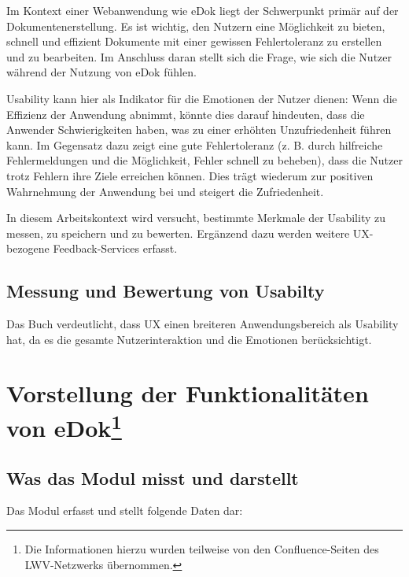 \documentclass[12pt,oneside]{article}
\begin{document}
Im Kontext einer Webanwendung wie eDok liegt der Schwerpunkt primär auf der Dokumentenerstellung. Es ist wichtig, den Nutzern eine Möglichkeit zu bieten, schnell und effizient Dokumente mit einer gewissen Fehlertoleranz zu erstellen und zu bearbeiten. Im Anschluss daran stellt sich die Frage, wie sich die Nutzer während der Nutzung von eDok fühlen.

Usability kann hier als Indikator für die Emotionen der Nutzer dienen: Wenn die Effizienz der Anwendung abnimmt, könnte dies darauf hindeuten, dass die Anwender Schwierigkeiten haben, was zu einer erhöhten Unzufriedenheit führen kann. Im Gegensatz dazu zeigt eine gute Fehlertoleranz (z. B. durch hilfreiche Fehlermeldungen und die Möglichkeit, Fehler schnell zu beheben), dass die Nutzer trotz Fehlern ihre Ziele erreichen können. Dies trägt wiederum zur positiven Wahrnehmung der Anwendung bei und steigert die Zufriedenheit.

In diesem Arbeitskontext wird versucht, bestimmte Merkmale der Usability zu messen, zu speichern und zu bewerten. Ergänzend dazu werden weitere UX-bezogene Feedback-Services erfasst.

 


 
\subsection{Messung und Bewertung von Usabilty}

Das Buch \cite{measuring} verdeutlicht, dass UX einen breiteren Anwendungsbereich als Usability hat, da es die gesamte Nutzerinteraktion und die Emotionen berücksichtigt.






\section{Vorstellung der Funktionalitäten von eDok\protect \footnote{Die Informationen hierzu wurden teilweise von den Confluence-Seiten des LWV-Netzwerks übernommen.}}



\subsection{Was das Modul misst und darstellt}

Das Modul erfasst und stellt folgende Daten dar:
\end{document}
